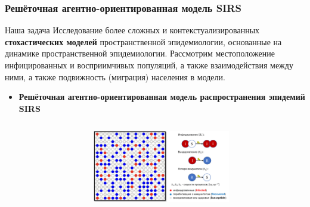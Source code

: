 \documentclass[
    11pt, %
    aspectratio=169, %
]{beamer}
\begin{document}
\begin{frame}
	\frametitle{Решёточная агентно-ориентированная модель SIRS}
    \fontsize{8}{10}\selectfont{}

    \begin{block}{\small Наша задача}
        Исследование более сложных и контекстуализированных \textbf{стохастических моделей} пространственной эпидемиологии, основанные на динамике пространственной эпидемиологии. Рассмотрим местоположение инфицированных и восприимчивых популяций, а также взаимодействия между ними, а также подвижность (миграция) населения в модели.
    \end{block}

    \begin{itemize}
        \item \textbf{Решёточная агентно-ориентированная модель распространения эпидемий SIRS}
    \end{itemize}

    \begin{columns}[t] %
        \begin{column}{0.02\textwidth}
        \end{column}

        \begin{column}{0.38\textwidth}
            \fontsize{6}{4}\selectfont{Решёточная агентно-ориентированная модель 18 \times 18}

            \begin{figure}
                \vspace{-0.1cm}
                \centering
                \includegraphics[angle=0, width=6cm]{Grid.png}
            \end{figure}
        \end{column}


\end{columns}
\end{frame}
\end{document}
